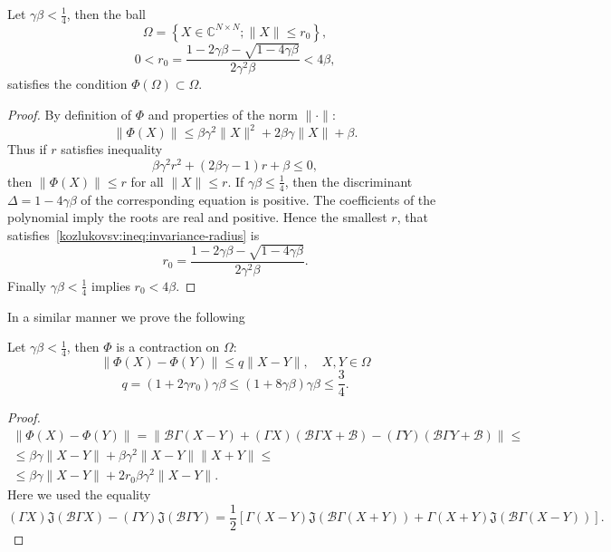\begin{lem}
    Let \( \gamma\beta < \frac14\),
    then the ball
    \[
        \Omega = \left\{ X\in \mathbb{C}^{N{\times}N}; \|X\| \leq r_0 \right\}, \]
    \[  0 < r_0 = \frac{1 - 2\gamma\beta - \sqrt{1-4\gamma\beta}}{2\gamma^2\beta} < 4\beta, \]
    satisfies the condition \( \Phi(\Omega)\subset\Omega \).
\end{lem}
\begin{proof}
By definition of \( \Phi \) and properties of the norm \( \|\cdot\| \):
    \[ \| \Phi(X) \| \leq
     \beta \gamma^2 \|X\|^2 + 2\beta\gamma\|X\| + \beta. \]
Thus if \( r \) satisfies inequality
    \begin{equation}\label{kozlukovsv:ineq:invariance-radius}
        \beta \gamma^2 r^2 + (2\beta\gamma - 1)r + \beta \leq 0,
    \end{equation}
    then \( \|\Phi(X)\| \leq r \) for all \( \|X\| \leq r \).
If \( \gamma\beta \leq \frac14 \),
    then the discriminant \( \Delta = 1-4\gamma\beta \)
    of the corresponding equation is positive.
The coefficients of the polynomial imply the roots are real and positive.
Hence the smallest \( r \),
    that satisfies~\eqref{kozlukovsv:ineq:invariance-radius} is
    \[ r_0 = \frac{1 - 2\gamma\beta - \sqrt{1-4\gamma\beta}}{2\gamma^2\beta}. \]
Finally \( \gamma\beta<\frac14 \) implies \( r_0 < 4\beta \).
\end{proof}

In a similar manner we prove the following
\begin{lem}
    Let \(\gamma\beta<\frac14\),
    then \( \Phi \) is a contraction on \( \Omega \):
    \[ \| \Phi(X) - \Phi(Y) \| \leq q \|X - Y\|, \quad X,Y\in\Omega \]
    \[ q = (1+2\gamma r_0) \gamma\beta \leq (1+8\gamma\beta)\gamma\beta \leq \frac34. \]
\end{lem}
\begin{proof}
    \begin{align*} \| \Phi(X) - \Phi(Y) \| = \| \mathcal{B}\Gamma (X-Y) + (\Gamma X)(\mathcal{B}\Gamma X + \mathcal{B})
     - (\Gamma Y)(\mathcal{B} \Gamma Y + \mathcal{B}) \| \leq \\
        \leq
     \beta\gamma\|X-Y\| +
     \beta \gamma^2 \|X-Y\| \|X+Y\| \leq \\
        \leq
     \beta\gamma\|X-Y\| +
     2 r_0 \beta \gamma^2 \|X-Y\|.
    \end{align*}
Here we used the equality
\[ (\Gamma X) \mathfrak{J}(\mathcal{B}\Gamma X) - (\Gamma Y) \mathfrak{J}(\mathcal{B}\Gamma Y) =
    \frac12\left[
        \Gamma(X-Y) \mathfrak{J}(\mathcal{B}\Gamma(X+Y))
    +   \Gamma(X+Y) \mathfrak{J}(\mathcal{B}\Gamma(X-Y))
    \right]. \]
\end{proof}

